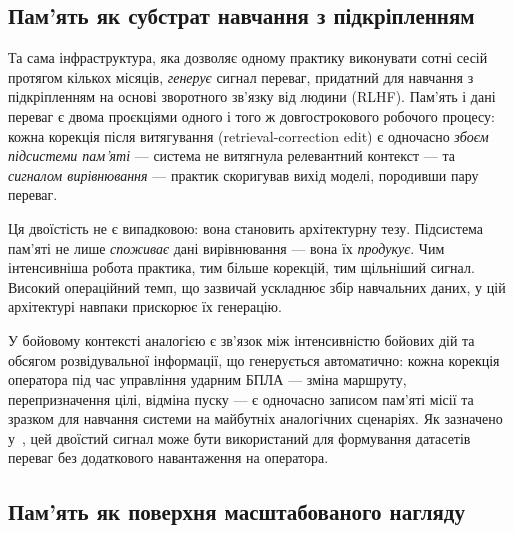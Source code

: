 

\subsection{Пам'ять як субстрат навчання з підкріпленням}
\label{sec:disc-rlhf-substrate}

Та сама інфраструктура, яка дозволяє одному практику виконувати сотні сесій протягом кількох місяців, \emph{генерує} сигнал переваг, придатний для навчання з підкріпленням на основі зворотного зв'язку від людини (RLHF).
Пам'ять і дані переваг є двома проєкціями одного і того ж довгострокового робочого процесу: кожна корекція після витягування (retrieval-correction edit) є одночасно \emph{збоєм підсистеми пам'яті} --- система не витягнула релевантний контекст --- та \emph{сигналом вирівнювання} --- практик скоригував вихід моделі, породивши пару переваг.

Ця двоїстість не є випадковою: вона становить архітектурну тезу.
Підсистема пам'яті не лише \emph{споживає} дані вирівнювання --- вона їх \emph{продукує}.
Чим інтенсивніша робота практика, тим більше корекцій, тим щільніший сигнал.
Високий операційний темп, що зазвичай ускладнює збір навчальних даних, у цій архітектурі навпаки прискорює їх генерацію.

У бойовому контексті аналогією є зв'язок між інтенсивністю бойових дій та обсягом розвідувальної інформації, що генерується автоматично: кожна корекція оператора під час управління ударним БПЛА --- зміна маршруту, перепризначення цілі, відміна пуску --- є одночасно записом пам'яті місії та зразком для навчання системи на майбутніх аналогічних сценаріях.
Як зазначено у~\citet{ovcharov2026edittrace}, цей двоїстий сигнал може бути використаний для формування датасетів переваг без додаткового навантаження на оператора.


\subsection{Пам'ять як поверхня масштабованого нагляду}
\label{sec:disc-oversight-surface}

